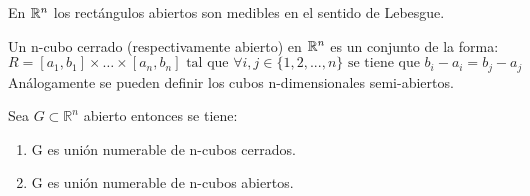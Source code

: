 \begin{observación}
En $\mathbb{R}^n$ los rectángulos abiertos son medibles en el sentido de Lebesgue.
\end{observación}

\begin{definición}
Un n-cubo cerrado (respectivamente abierto) en $\mathbb{R}^n$ es un conjunto de la forma:
\begin{equation}
    R = [a_1, b_1] \times \ldots \times [a_n, b_n] \text{ tal que } \forall i,j \in \{1,2,...,n\} \text{ se tiene que } b_i - a_i = b_j - a_j
\end{equation}
Análogamente se pueden definir los cubos n-dimensionales semi-abiertos.
\end{definición}


\begin{teorema}
    Sea $G \subset \mathbb{R}^n$ abierto entonces se tiene:
    \vspace{-0.5em}
    \begin{enumerate}
        \item G es unión numerable de n-cubos cerrados.
        \item G es unión numerable de n-cubos abiertos.
    \end{enumerate}
\end{teorema}

